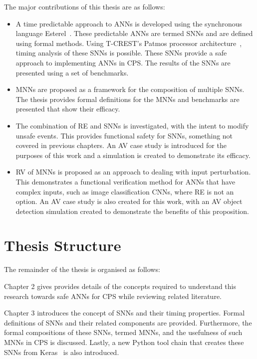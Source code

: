 The major contributions of this thesis are as follows:
\begin{itemize}
	\item A time predictable approach to \acp{ANN} is developed using the synchronous language Esterel~\cite{berry2000foundations}. These predictable \acp{ANN} are termed \acfp{SNN} and are defined using formal methods. Using T-CREST's Patmos processor architecture~\cite{patmos:ppes2011}, timing analysis of these \acp{SNN} is possible. These \acp{SNN} provide a safe approach to implementing \acp{ANN} in \ac{CPS}. The results of the \acp{SNN} are presented using a set of benchmarks. 
	\item \acfp{MNN} are proposed as a framework for the composition of multiple \acp{SNN}. The thesis provides formal definitions for the \acp{MNN} and benchmarks are presented that show their efficacy. 
	\item The combination of \acf{RE} and \acp{SNN} is investigated, with the intent to modify unsafe events. This provides functional safety for \acp{SNN}, something not covered in previous chapters. An \acf{AV} case study is introduced for the purposes of this work and a simulation is created to demonstrate its efficacy.
	\item \acf{RV} of \acp{MNN} is proposed as an approach to dealing with input perturbation. This demonstrates a functional verification method for \acp{ANN} that have complex inputs, such as image classification \acfp{CNN}, where \ac{RE} is not an option. An \ac{AV} case study is also created for this work, with an \ac{AV} object detection simulation created to demonstrate the benefits of this proposition. 
\end{itemize}

\section{Thesis Structure}
The remainder of the thesis is organised as follows:

Chapter 2 gives provides details of the concepts required to understand this research towards safe \acp{ANN} for \ac{CPS} while reviewing related literature.

Chapter 3 introduces the concept of \acfp{SNN} and their timing properties.
Formal definitions of \acp{SNN} and their related components are provided.
Furthermore, the formal compositions of these \acp{SNN}, termed \acp{MNN}, and the usefulness of such \acp{MNN} in \ac{CPS} is discussed.
Lastly, a new Python tool chain that creates these \acp{SNN} from Keras~\cite{chollet2015keras} is also introduced.

